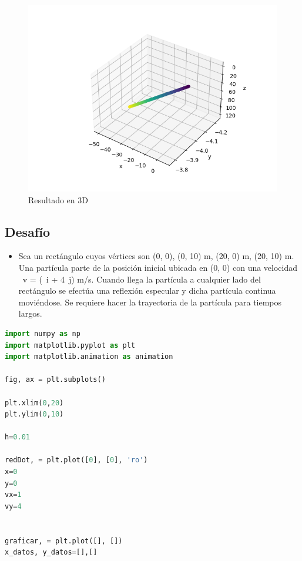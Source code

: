 \documentclass{article}
\begin{document}
\begin{flushleft}
\begin{enumerate}
\begin{itemize}
    \begin{figure}[H]
    \centering
    \includegraphics[width=1.35\textwidth]{3d_2.png}
    \caption{Resultado en 3D}
    \end{figure}
    
    \end{itemize}
    
    \subsection{Desafío}
    \begin{itemize}
        \item Sea un rectángulo cuyos vértices son (0, 0), (0, 10) m, (20, 0) m, (20, 10) m. Una partícula parte de
la posición inicial ubicada en (0, 0) con una velocidad ~v = (~i + 4~j) m/s. Cuando llega la partícula a
cualquier lado del rectángulo se efectúa una reflexión especular y dicha partícula continua moviéndose.
Se requiere hacer la trayectoria de la partícula para tiempos largos.
    \end{itemize}
   
     \begin{lstlisting}[language=Python,caption=Ejercicio 3]
import numpy as np
import matplotlib.pyplot as plt
import matplotlib.animation as animation

fig, ax = plt.subplots()

plt.xlim(0,20)
plt.ylim(0,10)

h=0.01

redDot, = plt.plot([0], [0], 'ro')
x=0
y=0
vx=1
vy=4


graficar, = plt.plot([], [])
x_datos, y_datos=[],[]


\end{lstlisting}
\end{enumerate}
\end{flushleft}
\end{document}
